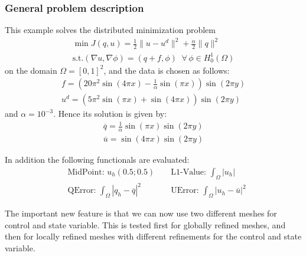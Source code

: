 \subsubsection{General problem description}
This example solves the distributed minimization problem
\begin{gather*}
\min J(q,u) = \frac{1}{2} \|u-u^d\|^2 + \frac{\alpha}{2}\|q\|^2\\
\text{s.t.} (\nabla u,\nabla \phi) = (q+f,\phi)\;\;\forall\,\phi \in H^1_0(\Omega)
\end{gather*}
on the domain $\Omega = [0,1]^2$, and the data is chosen as follows:
\begin{gather*}
 f = \left(20\pi^2  \sin(4 \pi x) - \frac{1}{\alpha}  \sin(\pi x)\right) \sin(2 \pi y)\\
 u^d = \left( 5 \pi^2 \sin(\pi x) + \sin(4 \pi x)\right)  \sin(2\pi y)
\end{gather*}
and $\alpha = 10^{-3}$.
Hence its solution is given by:
\begin{gather*}
 \overline{q} = \frac{1}{\alpha} \sin(\pi x) \sin(2 \pi y)\\
 \overline{u} = \sin(4 \pi x) \sin(2 \pi y)
\end{gather*}

In addition the following functionals are evaluated:
\begin{align*}
  &\text{MidPoint: } u_h(0.5 ; 0.5)&&
  \text{ L1-Value: }\int_\Omega |u_h|\\
  &\text{QError: }\int_\Omega |q_h-\overline{q}|^2
  &&\text{  UError: }\int_\Omega |u_h-\overline{u}|^2
\end{align*}

The important new feature is that we can now use two different meshes for control and state variable.
This is tested first for globally refined meshes, and then for locally refined meshes with different refinements 
for the control and state variable.
